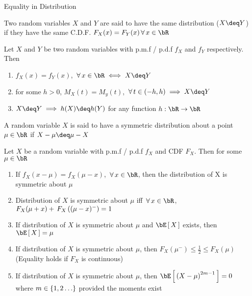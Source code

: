 \documentclass{article}
\begin{document}
\makeheader%

\begin{ssection}{Equality in Distribution}

	\begin{definition}
		Two random variables $X$ and $Y$ are said to have the same distribution ($X \deq Y$) if they have the same C.D.F.  $F_X(x) = F_Y(x) \qforall x \in \bR$
	\end{definition}

	\begin{result}
		Let $X$ and $Y$ be two random variables with p.m.f / p.d.f $f_X$ and $f_Y$ respectively. Then

		\begin{enumerate}[label=(\roman*)]
			\item $f_X(x) = f_Y(x)$, $\qforall x \in \bR \iff X \deq Y$
			\item for some $h > 0$, $M_X(t) = M_y(t)$, $\qforall t \in (-h, h) \implies X \deq Y$
			\item $X \deq Y \implies h(X) \deq h(Y)$ for any function $h : \bR \ra \bR$
		\end{enumerate}
	\end{result}

	\begin{definition}
		A random variable $X$ is said to have a symmetric distribution about a point $\mu \in \bR$ if $X - \mu \deq \mu - X$
	\end{definition}

	\begin{result}
		Let $X$ be a random variable with p.m.f / p.d.f $f_X$ and CDF $F_X$. Then for some $\mu \in \bR$

		\begin{enumerate}[label=(\roman*)]
			\item If $f_X(x - \mu) = f_X(\mu - x)$, $\qforall x \in \bR$, then the distribution of X is symmetric about $\mu$
			\item Distribution of $X$ is symmetric about $\mu$ iff $\qforall x \in \bR$, $F_X(\mu + x) + \func{F_X}{(\mu - x)^-} = 1$
			\item If distribution of $X$ is symmetric about $\mu$ and $\E{X}$ exists, then $\E{X} = \mu$
			\item If distribution of $X$ is symmetric about $\mu$, then $F_X(\mu^-) \le \frac{1}{2} \le F_X(\mu)$ (Equality holds if $F_X$ is continuous)
			\item If distribution of $X$ is symmetric about $\mu$, then $\E{\para{X - \mu}^{2m - 1}} = 0$ where $m \in \left\{ {1, 2 \dots} \right\}$ provided the moments exist
		\end{enumerate}
	\end{result}

\end{ssection}
\end{document}
